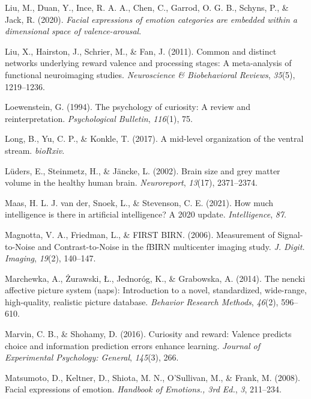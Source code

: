 \documentclass[11pt,american,a4paper,oneside,]{memoir} %
\begin{document}
\leavevmode\hypertarget{ref-Liu2020-vo}{}%
Liu, M., Duan, Y., Ince, R. A. A., Chen, C., Garrod, O. G. B., Schyns, P., \& Jack, R. (2020). \emph{Facial expressions of emotion categories are embedded within a dimensional space of valence-arousal}.

\leavevmode\hypertarget{ref-liu2011common}{}%
Liu, X., Hairston, J., Schrier, M., \& Fan, J. (2011). Common and distinct networks underlying reward valence and processing stages: A meta-analysis of functional neuroimaging studies. \emph{Neuroscience \& Biobehavioral Reviews}, \emph{35}(5), 1219--1236.

\leavevmode\hypertarget{ref-loewenstein1994psychology}{}%
Loewenstein, G. (1994). The psychology of curiosity: A review and reinterpretation. \emph{Psychological Bulletin}, \emph{116}(1), 75.

\leavevmode\hypertarget{ref-Long2017-fb}{}%
Long, B., Yu, C. P., \& Konkle, T. (2017). A mid-level organization of the ventral stream. \emph{bioRxiv}.

\leavevmode\hypertarget{ref-Luders2002-ms}{}%
Lüders, E., Steinmetz, H., \& Jäncke, L. (2002). Brain size and grey matter volume in the healthy human brain. \emph{Neuroreport}, \emph{13}(17), 2371--2374.

\leavevmode\hypertarget{ref-Van_der_Maas2021-rx}{}%
Maas, H. L. J. van der, Snoek, L., \& Stevenson, C. E. (2021). How much intelligence is there in artificial intelligence? A 2020 update. \emph{Intelligence}, \emph{87}.

\leavevmode\hypertarget{ref-Magnotta2006-zs}{}%
Magnotta, V. A., Friedman, L., \& FIRST BIRN. (2006). Measurement of Signal-to-Noise and Contrast-to-Noise in the fBIRN multicenter imaging study. \emph{J. Digit. Imaging}, \emph{19}(2), 140--147.

\leavevmode\hypertarget{ref-marchewka2014nencki}{}%
Marchewka, A., Żurawski, Ł., Jednoróg, K., \& Grabowska, A. (2014). The nencki affective picture system (naps): Introduction to a novel, standardized, wide-range, high-quality, realistic picture database. \emph{Behavior Research Methods}, \emph{46}(2), 596--610.

\leavevmode\hypertarget{ref-marvin2016curiosity}{}%
Marvin, C. B., \& Shohamy, D. (2016). Curiosity and reward: Valence predicts choice and information prediction errors enhance learning. \emph{Journal of Experimental Psychology: General}, \emph{145}(3), 266.

\leavevmode\hypertarget{ref-Matsumoto2008-qk}{}%
Matsumoto, D., Keltner, D., Shiota, M. N., O'Sullivan, M., \& Frank, M. (2008). Facial expressions of emotion. \emph{Handbook of Emotions., 3rd Ed.}, \emph{3}, 211--234.
\end{document}
